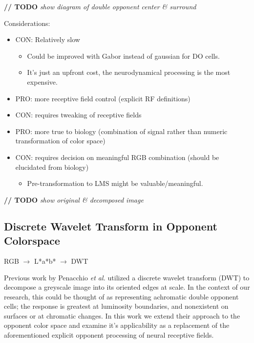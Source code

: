 \documentclass[journal,onecolumn]{IEEEtran}
\begin{document}
\textbf{// TODO} \textit{show diagram of double opponent center \& surround}


Considerations:
\begin{itemize}
    \item CON: Relatively slow
    \begin{itemize}
        \item Could be improved with Gabor instead of gaussian for DO cells.
        \item It's just an upfront cost, the neurodynamical processing is the most expensive.
    \end{itemize}
    \item PRO: more receptive field control (explicit RF definitions)
    \item CON: requires tweaking of receptive fields
    \item PRO: more true to biology (combination of signal rather than numeric transformation of color space)
    \item CON: requires decision on meaningful RGB combination (should be elucidated from biology)
    \begin{itemize}
        \item Pre-transformation to LMS might be valuable/meaningful.
    \end{itemize}
\end{itemize}

\textbf{// TODO} \textit{show original \& decomposed image}


\subsection{Discrete Wavelet Transform in Opponent Colorspace}

RGB $\rightarrow$ L*a*b* $\rightarrow$ DWT

Previous work by Penacchio \textit{et al.} \cite{otazu:plosone} utilized a discrete wavelet transform (DWT) to decompose a greyscale image into its oriented edges at scale. In the context of our research, this could be thought of as representing achromatic double opponent cells; the response is greatest at luminosity boundaries, and nonexistent on surfaces or at chromatic changes. In this work we extend their approach to the opponent color space and examine it's applicability as a replacement of the aforementioned explicit opponent processing of neural receptive fields.
\end{document}
